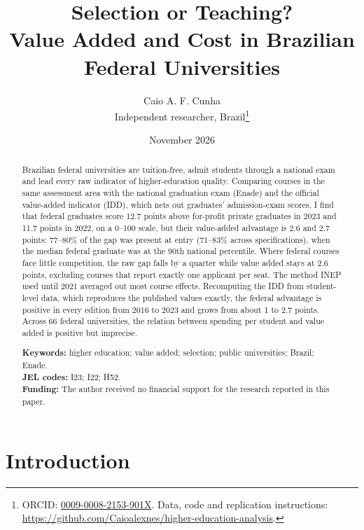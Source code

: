 \documentclass[12pt,letterpaper]{article}
\title{\textbf{Selection or Teaching?}\\[0.2em]\large Value Added and Cost in Brazilian Federal Universities}
\author{Caio A. F. Cunha\\[0.2em]\normalsize Independent researcher, Brazil\thanks{ORCID: \href{https://orcid.org/0009-0008-2153-901X}{0009-0008-2153-901X}. Data, code and replication instructions: \url{https://github.com/Caioalexnes/higher-education-analysis}.}}
\date{November 2026}
\begin{document}
\maketitle

\begin{abstract}
\singlespacing
\noindent Brazilian federal universities are tuition-free, admit students through a national exam and lead every raw indicator of higher-education quality. Comparing courses in the same assessment area with the national graduation exam (Enade) and the official value-added indicator (IDD), which nets out graduates' admission-exam scores, I find that federal graduates score 12.7 points above for-profit private graduates in 2023 and 11.7 points in 2022, on a 0--100 scale, but their value-added advantage is 2.6 and 2.7 points: 77--80\% of the gap was present at entry (71--83\% across specifications), when the median federal graduate was at the 90th national percentile. Where federal courses face little competition, the raw gap falls by a quarter while value added stays at 2.6 points, excluding courses that report exactly one applicant per seat. The method INEP used until 2021 averaged out most course effects. Recomputing the IDD from student-level data, which reproduces the published values exactly, the federal advantage is positive in every edition from 2016 to 2023 and grows from about 1 to 2.7 points. Across 66 federal universities, the relation between spending per student and value added is positive but imprecise.

\medskip
\noindent\textbf{Keywords:} higher education; value added; selection; public universities; Brazil; Enade.\\
\noindent\textbf{JEL codes:} I23; I22; H52.\\
\noindent\textbf{Funding:} The author received no financial support for the research reported in this paper.
\end{abstract}

\newpage
\section{Introduction}\label{sec:intro}
\end{document}
